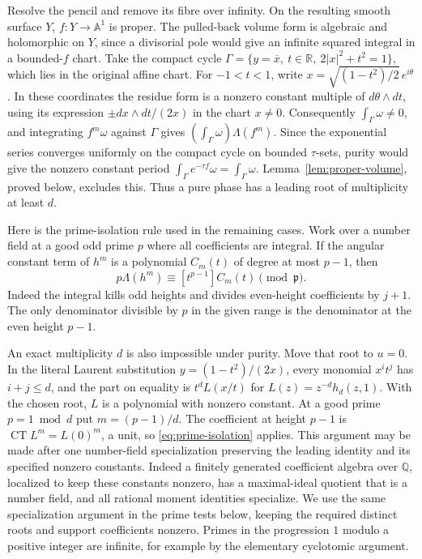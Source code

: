 Resolve the pencil and remove its fibre over infinity. On the resulting
smooth surface \(Y\), \(f:Y\to\mathbb A^1\) is proper. The pulled-back
volume form is algebraic and holomorphic on \(Y\), since a divisorial pole
would give an infinite squared integral in a bounded-\(f\) chart.
Take the compact cycle \(\Gamma=\{y=\overline x,\ t\in\mathbb R,\
2|x|^2+t^2=1\}\), which lies in the original affine chart. For
\(-1<t<1\), write \(x=\sqrt{(1-t^2)/2}\,e^{i\theta}\). In these coordinates
the residue form is a nonzero constant multiple of \(d\theta\wedge dt\),
using its expression \(\pm dx\wedge dt/(2x)\) in the chart \(x\ne0\).
Consequently \(\int_\Gamma\omega\ne0\), and integrating \(f^m\omega\)
against \(\Gamma\) gives \((\int_\Gamma\omega)\Lambda(f^m)\).
Since the exponential series converges uniformly on the compact cycle on
bounded \(\tau\)-sets, purity would give the nonzero constant period
\(\int_\Gamma e^{-\tau f}\omega=\int_\Gamma\omega\).
Lemma~\ref{lem:proper-volume}, proved below, excludes this. Thus a pure
phase has a leading root of multiplicity at least \(d\).

Here is the prime-isolation rule used in the remaining cases. Work over
a number field at a good odd prime \(p\) where all coefficients are
integral. If the angular constant term of \(h^m\) is a polynomial
\(C_m(t)\) of degree at most \(p-1\), then
\begin{equation}\label{eq:prime-isolation}
                 p\Lambda(h^m)\equiv [t^{p-1}]C_m(t)\pmod{\mathfrak p}.
\end{equation}
Indeed the integral kills odd heights and divides even-height coefficients
by \(j+1\). The only denominator divisible by \(p\) in the given range is
the denominator at the even height \(p-1\).

An exact multiplicity \(d\) is also impossible under purity. Move that
root to \(u=0\). In the literal Laurent substitution \(y=(1-t^2)/(2x)\),
every monomial \(x^i t^j\) has \(i+j\le d\), and the part on equality is
\(t^d L(x/t)\) for \(L(z)=z^{-d}h_d(z,1)\). With the chosen root, \(L\) is
a polynomial with nonzero constant. At a good prime \(p=1\bmod d\) put
\(m=(p-1)/d\). The coefficient at height \(p-1\) is
\(\operatorname{CT}L^m=L(0)^m\), a unit, so \eqref{eq:prime-isolation}
applies. This argument may be made after
one number-field specialization preserving the leading identity and its
specified nonzero constants. Indeed a finitely generated coefficient
algebra over \(\mathbb Q\), localized to keep these constants nonzero, has a
maximal-ideal quotient that is a number field, and all rational moment
identities specialize. We use the same specialization argument in the
prime tests below, keeping the required distinct roots and support
coefficients nonzero. Primes in the progression \(1\) modulo a positive
integer are infinite, for example by the elementary cyclotomic argument.

